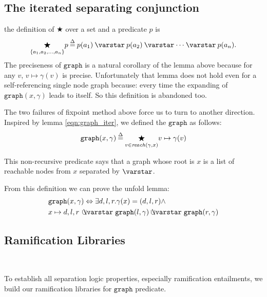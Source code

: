 \subsection{The iterated separating conjunction}
the definition of $\bigstar$ over a set and a
predicate $p$ is
\begin{equation*}
  \underset{\{a_1, a_2,\dots,a_n\}}{\bigstar}p \defeq p(a_1) \scon
  p(a_2) \scon \dots \scon p(a_n).
\end{equation*}
The preciseness of $\mathtt{graph}$ is a natural corollary of the
lemma above because for any $v$, $v\mapsto\gamma(v)$ is
precise. Unfortunately that lemma does not hold even for a
self-referencing single node graph because: every time the expanding
of $\mathtt{graph}(x,\gamma)$ leads to itself. So this definition is
abandoned too.

The two failures of fixpoint method above force us to turn to another
direction. Inspired by lemma \ref{eqn:graph_iter}, we defined the
$\mathtt{graph}$ as follows:
\begin{equation}\label{eqn:iter_def}
  \mathtt{graph}(x, \gamma)\mathbin{\stackrel{\Delta}{=}}\underset{v\in\mathit{reach}(\gamma, x)}{\bigstar} v\mapsto\gamma(v)
\end{equation}

This non-recursive predicate says that a graph whose root is $x$ is a
list of reachable nodes from $x$ separated by $\scon$.

\label{sec:foldunfold} From this definition we can prove the unfold lemma:
\begin{equation}\label{eqn:unfold_graph}
  \begin{split}
  & \mathtt{graph}(x, \gamma) \Leftrightarrow \exists d,l,r
    . \gamma(x)=(d,l,r) \wedge \\ & x \mapsto d,l,r\, \ocon
    \mathtt{graph}(l, \gamma) \ocon \mathtt{graph}(r, \gamma)
  \end{split}
\end{equation}


\subsection{Ramification Libraries}\

To establish all separation logic properties, especially ramification entailments, we build our ramification libraries for $\mathtt{graph}$ predicate.

